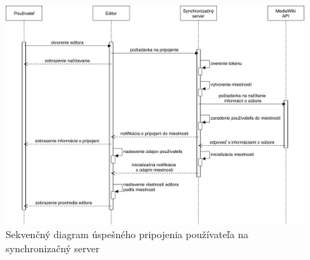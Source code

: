 \begin{figure}[H]
	\centerline{\includegraphics[width=1\textwidth]{images/diagrams/sequence-diagram-server-connect}}
	\caption[Sekvenčný diagram pripojenia používateľa]{Sekvenčný diagram úspešného pripojenia používateľa na synchronizačný server}
	\label{obr:sequence-diagram-server-connect}
\end{figure}
\FloatBarrier

